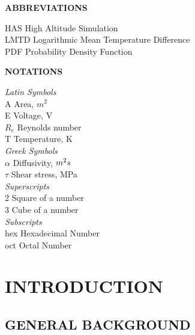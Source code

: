 \documentclass[12pt,a4paper]{report}
\begin{document}
\newpage
\listoftables
{}

\newpage
{\centering \textbf{\Large ABBREVIATIONS} \par }
\vspace{.35in}
\noindent
HAS \tab High Altitude Simulation \\
LMTD \tab Logarithmic Mean Temperature Difference \\
PDF \tab Probability Density Function \\




\newpage
{\centering \textbf{\Large NOTATIONS}  \par }
\vspace{.25in}
\noindent %
\break\textit{Latin Symbols} \\
A \tab \tab Area, $m^{2}$ \\
E \tab \tab Voltage, V \\
$R_{e}$ \tab \tab Reynolds number \\
T \tab \tab Temperature, K \\
\break\textit{Greek Symbols} \\
$\alpha$ \tab \tab Diffusivity, $m^{2}\/s$ \\
$\tau$ \tab \tab Shear stress, MPa \\
\break\textit{Superscripts} \\
2 \tab \tab Square of a number \\
3 \tab \tab Cube of a number \\
\break \textit{Subscripts} \\
hex \tab Hexadecimal Number \\
oct \tab Octal Number


\newpage

\chapter{INTRODUCTION}

\section{GENERAL BACKGROUND}
\end{document}
